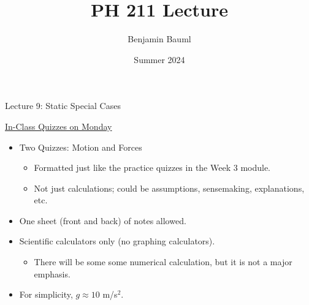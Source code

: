\documentclass[]{article}
\title{PH 211 Lecture \Week}
\author{Benjamin Bauml}
\date{Summer 2024}
\begin{document}
\begin{TeacherMargin}

\end{TeacherMargin}
\begin{PresentSpace}
\begin{center}
	\huge Lecture 9: Static Special Cases
\end{center}
\vspace{0.5cm}
\underline{In-Class Quizzes on Monday}
\begin{itemize}
	\item Two Quizzes: Motion and Forces
	\begin{itemize}
		\large
		\item Formatted just like the practice quizzes in the Week 3 module.
		\item Not just calculations; could be assumptions, sensemaking, explanations, etc.
	\end{itemize}
	\item One sheet (front and back) of notes allowed.
	\item Scientific calculators only (no graphing calculators).
	\begin{itemize}
		\large
		\item There will be some some numerical calculation, but it is not a major emphasis.
	\end{itemize}
	\item For simplicity, $g\approx 10$ m/s$^{2}$.
\end{itemize}
\end{PresentSpace}
\newpage
\end{document}
